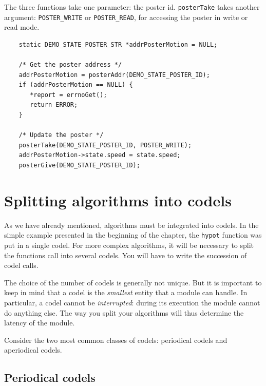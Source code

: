 The three functions take one  parameter: the poster id. {\tt posterTake}
takes another  argument:  {\tt POSTER\_WRITE} or  {\tt POSTER\_READ}, for
accessing the poster in write or read mode.

\begin{center}\begin{cartouche}\small\begin{verbatim}
    static DEMO_STATE_POSTER_STR *addrPosterMotion = NULL;

    /* Get the poster address */
    addrPosterMotion = posterAddr(DEMO_STATE_POSTER_ID);
    if (addrPosterMotion == NULL) {
       *report = errnoGet();
       return ERROR;
    }

    /* Update the poster */
    posterTake(DEMO_STATE_POSTER_ID, POSTER_WRITE);
    addrPosterMotion->state.speed = state.speed;
    posterGive(DEMO_STATE_POSTER_ID);
\end{verbatim}\end{cartouche}\end{center}


\section{Splitting algorithms into codels}
\label{sec|codels|split}

As   we have   already  mentioned,  algorithms   must  be integrated into
codels. In the simple example presented  in the beginning of the chapter,
the  {\tt hypot} function  was put in a   single codel.  For more complex
algorithms, it will be necessary to split the functions call into several
codels. You will have to write the succession of codel calls.

The choice  of the number of  codels is generally  not unique.  But it is
important to keep in mind that a codel  is the {\em smallest} entity that
a module can handle. In particular, a  codel cannot be {\em interrupted}:
during  its execution the   module cannot do   anything else. The way you
split your algorithms will thus determine the latency of the module.

Consider  the two most  common classes of   codels: periodical codels and
aperiodical codels.

\subsection{Periodical codels}

